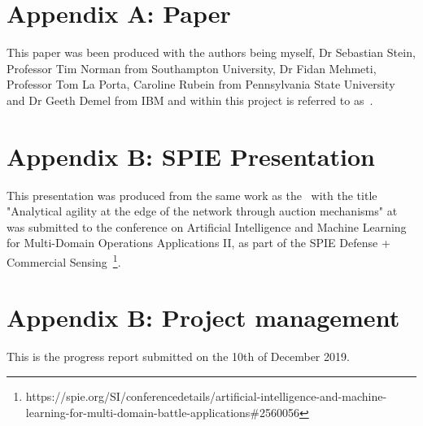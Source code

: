 
\section*{Appendix A: Paper}
This paper was been produced with the authors being myself, Dr Sebastian Stein, Professor Tim Norman from Southampton
University, Dr Fidan Mehmeti, Professor Tom La Porta, Caroline Rubein from Pennsylvania State University and Dr Geeth
Demel from IBM and within this project is referred to as~\cite{FlexibleResourceAllocation}.



\section*{Appendix B: SPIE Presentation}
This presentation was produced from the same work as the~\cite{FlexibleResourceAllocation} with the title "Analytical
agility at the edge of the network through auction mechanisms" at was submitted to the conference on Artificial
Intelligence and Machine Learning for Multi-Domain Operations Applications II, as part of the SPIE Defense + Commercial
Sensing~\footnote{https://spie.org/SI/conferencedetails/artificial-intelligence-and-machine-learning-for-multi-domain-battle-applications\#2560056}.



\section*{Appendix B: Project management}
This is the progress report submitted on the 10th of December 2019.


